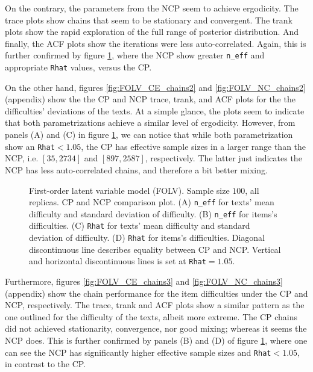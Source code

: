 On the contrary, the parameters from the NCP seem to achieve ergodicity. The trace plots show chains that seem to be stationary and convergent. The trank plots show the rapid exploration of the full range of posterior distribution. And finally, the ACF plots show the iterations were less auto-correlated. Again, this is further confirmed by figure \ref{fig:FOLV_stat1}, where the NCP show greater \texttt{n\_eff} and appropriate \texttt{Rhat} values, versus the CP.

On the other hand, figures \ref{fig:FOLV_CE_chains2} and \ref{fig:FOLV_NC_chains2} (appendix) show the the CP and NCP trace, trank, and ACF plots for the the difficulties' deviations of the texts. At a simple glance, the plots seem to indicate that both parametrizations achieve a similar level of ergodicity. However, from panels (A) and (C) in figure \ref{fig:FOLV_stat1}, we can notice that while both parametrization show an \texttt{Rhat}$<1.05$, the CP has effective sample sizes in a larger range than the NCP, i.e. $[35, 2734]$ and $[897, 2587]$, respectively. The latter just indicates the NCP has less auto-correlated chains, and therefore a bit better mixing.
%
\begin{figure}[h]
	\centering
	\begin{subfigure}
		\texttt{[image: FOLV\_100\_neff1]}
	\end{subfigure}
	\begin{subfigure}
		\texttt{[image: FOLV\_100\_Rhat1]}
	\end{subfigure}
	\caption[First-order latent variable model (FOLV). Sample size $100$, all replicas. CP and NCP comparison plot.]%
	{First-order latent variable model (FOLV). Sample size $100$, all replicas. CP and NCP comparison plot. (A) \texttt{n\_eff} for texts' mean difficulty and standard deviation of difficulty. (B) \texttt{n\_eff} for items's difficulties. (C) \texttt{Rhat} for texts' mean difficulty and standard deviation of difficulty. (D) \texttt{Rhat} for items's difficulties. Diagonal discontinuous line describes equality between CP and NCP. Vertical and horizontal discontinuous lines is set at \texttt{Rhat}$=1.05$. }
	\label{fig:FOLV_stat1}
\end{figure}

Furthermore, figures \ref{fig:FOLV_CE_chains3} and \ref{fig:FOLV_NC_chains3} (appendix) show the chain performance for the item difficulties under the CP and NCP, respectively. The trace, trank and ACF plots show a similar pattern as the one outlined for the difficulty of the texts, albeit more extreme. The CP chains did not achieved stationarity, convergence, nor good mixing; whereas it seems the NCP does. This is further confirmed by panels (B) and (D) of figure \ref{fig:FOLV_stat1}, where one can see the NCP has significantly higher effective sample sizes and \texttt{Rhat}$<1.05$, in contrast to the CP.

